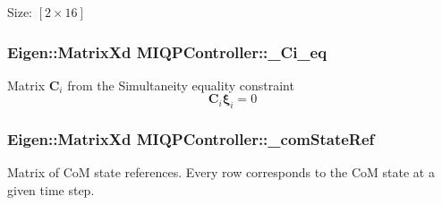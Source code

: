 \-Size\-: $[2\times16]$ \hypertarget{classMIQPController_a60d2b06d2d130a874ae3d14c97176f34}{
\subsubsection[{\-\_\-\-Ci\-\_\-eq}]{\setlength{\rightskip}{0pt plus 5cm}\-Eigen\-::\-Matrix\-Xd {\bf \-M\-I\-Q\-P\-Controller\-::\-\_\-\-Ci\-\_\-eq}}}\label{classMIQPController_a60d2b06d2d130a874ae3d14c97176f34}
\-Matrix $\mathbf{C}_i$ from the \-Simultaneity equality constraint \[ \mathbf{C}_i \mathbf{\xi}_i = 0 \] \hypertarget{classMIQPController_ab74859a8dd208f3fc7608391d318d469}{
\subsubsection[{\-\_\-com\-State\-Ref}]{\setlength{\rightskip}{0pt plus 5cm}\-Eigen\-::\-Matrix\-Xd {\bf \-M\-I\-Q\-P\-Controller\-::\-\_\-com\-State\-Ref}}}\label{classMIQPController_ab74859a8dd208f3fc7608391d318d469}
\-Matrix of \-Co\-M state references. \-Every row corresponds to the \-Co\-M state at a given time step.

